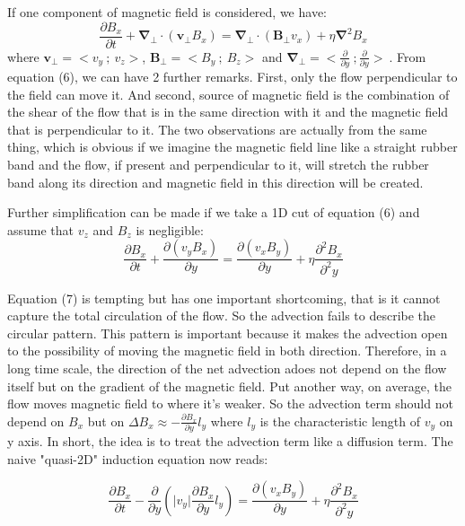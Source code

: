 \documentclass[11pt]{article}
\begin{document}
\begin{enumerate}
If one component of magnetic field is  considered, we have:
\begin{equation}
\frac{\partial B_x}{\partial t} + \bm{\nabla_{\bot} \cdot}(\bm{v}_{\bot}B_x)   = \bm{\nabla_{\bot} \cdot}(\bm{B}_{\bot}v_x) + \eta \bm{{\nabla}} ^2 B_x
\end{equation}
where $\bm{v}_{\bot} = <v_y \ ; \ v_z>$, $ \bm{B}_{\bot} = <B_y \ ; \ B_z>$ and $\bm{\nabla_{\bot}}= <\frac{\partial}{\partial y} \ ;  \frac{\partial}{\partial y} > \ $. From equation (6), we can have 2 further remarks. First, only the flow perpendicular to the field can move it. And second, source of magnetic field is the combination of the shear of the flow that is in the same direction with it and the magnetic field that is perpendicular to it. The two observations are actually from the same thing, which is obvious if we imagine the magnetic field line like a straight rubber band and the flow, if present and perpendicular to it, will stretch the rubber band along its direction and magnetic field in this direction will be created.

Further simplification can be made if we take a 1D cut of equation (6) and assume that $v_z $ and $B_z$ is negligible: 
\begin{equation}
\frac{\partial B_x}{\partial t} +  \frac{\partial({v}_y B_x)}{\partial y}
  = \frac{\partial(v_x B_y)}{\partial y}+ \eta{\frac{\partial^2 B_x}{\partial^2 y}}
\end{equation}

Equation (7) is tempting but has one important shortcoming, that is it cannot capture the total circulation of the flow. So the advection fails to describe the circular pattern. This pattern is important because it makes the advection open to the possibility of moving the magnetic field in both direction. Therefore, in a long time scale, the direction of the net advection adoes not depend on the flow itself but on the gradient of the magnetic field. Put another way, on average, the flow moves magnetic field to where it's weaker. So the advection term should not depend on $B_x$ but on $\Delta B_x \approx -\frac{\partial B_x}{\partial y} l_y $ where $l_y$ is the characteristic length of $v_y$ on y axis. In short, the idea is to treat the advection term like a diffusion term. The naive "quasi-2D" induction equation now reads:

\begin{equation}
\frac{\partial B_x}{\partial t} -  \frac{\partial}{\partial y} (\vert v_y \vert \frac{\partial B_x}{\partial y} l_y )
  = \frac{\partial(v_x B_y)}{\partial y}+ \eta{\frac{\partial^2 B_x}{\partial^2 y}}
\end{equation}


\end{enumerate}
\end{document}
